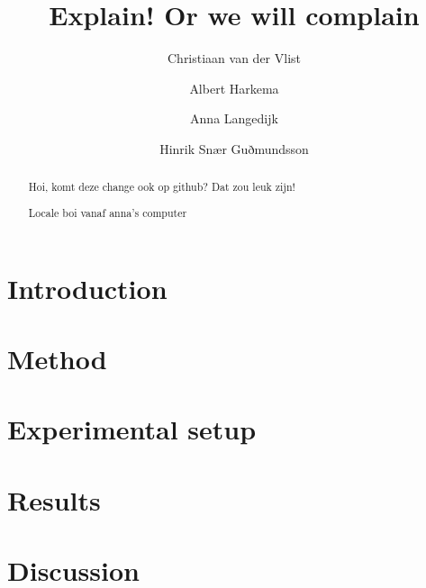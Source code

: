 \documentclass[sigconf,authordraft]{acmart}
\begin{document}
\title{Explain! Or we will complain}
\author{Christiaan van der Vlist}

\author{Albert Harkema}

\author{Anna Langedijk}

\author{Hinrik Snær Guðmundsson}
\renewcommand{\shortauthors}{van der Vlist, et al.}

\begin{abstract}
Hoi, komt deze change ook op github? Dat zou leuk zijn!

Locale boi vanaf anna's computer
\end{abstract}


\maketitle

\section{Introduction}


\section{Method}


\section{Experimental setup}


\section{Results}


\section{Discussion}

\end{document}
